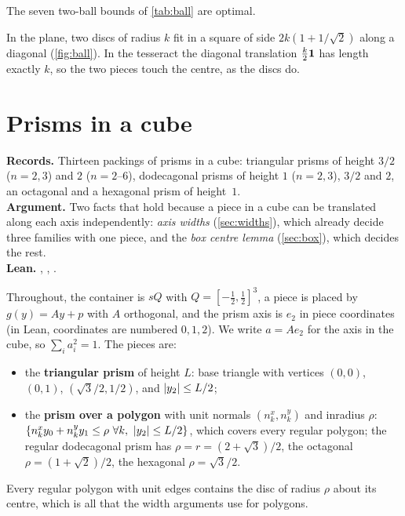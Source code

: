 \documentclass[11pt,a4paper]{article}
\begin{document}
\begin{theorem}\label{thm:ball-records}
The seven two-ball bounds of \cref{tab:ball} are optimal.
\end{theorem}

\begin{remark}
In the plane, two discs of radius $k$ fit in a square of side $2k(1+1/\sqrt2)$ along a diagonal (\cref{fig:ball}). In the tesseract the diagonal translation $\tfrac k2\mathbf 1$ has length exactly $k$, so the two pieces touch the centre, as the discs do.
\end{remark}

\section{Prisms in a cube}\label{sec:prisms}

\begin{summarybox}
\textbf{Records.} Thirteen packings of prisms in a cube: triangular prisms of height $3/2$ ($n=2,3$) and $2$ ($n=2$--$6$), dodecagonal prisms of height $1$ ($n=2,3$), $3/2$ and $2$, an octagonal and a hexagonal prism of height~$1$.\\
\textbf{Argument.} Two facts that hold because a piece in a cube can be translated along each axis independently: \emph{axis widths} (\cref{sec:widths}), which already decide three families with one piece, and the \emph{box centre lemma} (\cref{sec:box}), which decides the rest.\\
\textbf{Lean.} , , .
\end{summarybox}

Throughout, the container is $sQ$ with $Q=[-\tfrac12,\tfrac12]^3$, a piece is placed by $g(y)=Ay+p$ with $A$ orthogonal, and the prism axis is $e_2$ in piece coordinates (in Lean, coordinates are numbered $0,1,2$). We write $a=Ae_2$ for the axis in the cube, so $\sum_ia_i^2=1$. The pieces are:
\begin{itemize}
\item the \textbf{triangular prism}  of height $L$: base triangle with vertices $(0,0)$, $(0,1)$, $(\sqrt3/2,1/2)$, and $\lvert y_2\rvert\le L/2$;
\item the \textbf{prism over a polygon}  with unit normals $(n^x_k,n^y_k)$ and inradius $\rho$: $\{n^x_ky_0+n^y_ky_1\le\rho\ \forall k,\ \abs{y_2}\le L/2\}$, which covers every regular polygon; the regular dodecagonal prism  has $\rho=r=(2+\sqrt3)/2$, the octagonal $\rho=(1+\sqrt2)/2$, the hexagonal $\rho=\sqrt3/2$.
\end{itemize}
Every regular polygon with unit edges contains the disc of radius $\rho$ about its centre, which is all that the width arguments use for polygons.
\end{document}
